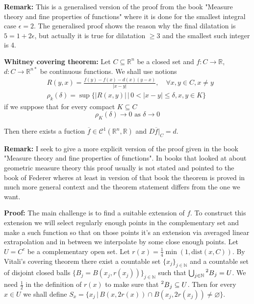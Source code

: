 \documentclass{article}
\begin{document}
\vspace{1ex}
\textbf{Remark:} This is a generalised version of the proof from the book
"Measure theory and fine properties of functions" where it is done for the
smallest integral case $\epsilon = 2$. The generalised proof shows the reason
why the final dilatation is $5 = 1+2\epsilon$, but actually it is true for
dilatation $\ge 3$ and the smallest such integer is 4.

\vspace{1ex}
\textbf{Whitney covering theorem:}
Let $C\subseteq \mathbb{R}^n$ be a closed set and $f:C\rightarrow\mathbb R$,
$d:C\rightarrow\mathbb{R}^{n*}$ be continuous functions. We shall use notions
\[
\begin{aligned}
    &R(y,x)=\frac{f(y)-f(x)-d(x)(y-x)}{|x-y|},\quad\forall x,y\in C, x\neq y \\
    &\rho_k(\delta)=\sup\{|R(x,y)|\, |\, 0<|x-y|\leq\delta, x, y\in K\}
\end{aligned}
\]
if we suppose that for every compact $K\subseteq C$
\begin{equation}
\rho_K(\delta)\rightarrow 0\text{ as }\delta\rightarrow 0
\end{equation}

Then there exists a fuction $\overline f\in\mathcal{C}^1(\mathbb{R}^n,\mathbb{R})$
and $D\overline f|_C=d$.

\vspace{1ex}
\textbf{Remark:}
I seek to give a more explicit version of the proof given in the book "Measure
theory and fine properties of functions". In books that looked at about
geometric measure theory this proof usually is not stated and pointed to the
book of Federer wheres at least in version of that book the theorem is proved
in much more general context and the theorem statement differs from the one we
want.

\vspace{1ex}
\textbf{Proof:}
The main challenge is to find a suitable extension of $f$. To construct this
extension we will select regularly enough points in the complementary set and
make a such function so that on those points it's an extension via averaged linear extrapolation and in
between we interpolate by some close enough points. Let $U=C^c$ be a complementary
open set. Let $r(x)=\frac{1}{4}\min(1,\text{dist}(x,C))$.
By Vitali's covering theorem there exist a countable set
$\{x_j\}_{j\in\mathbb{N}}$ and a countable set of disjoint closed balls $\{B_j=B(x_j, r(x_j))\}_
{j\in\mathbb{N}}$ such that $\bigcup_{j\in\mathbb{N}}\prescript{2}{}B_j=U$. We
need $\frac{1}{2}$ in the definition of $r(x)$ to make sure that $\prescript{2}{}
B_j\subseteq U$. Then for every $x\in U$ we shall define $S_x=\{x_j\,|\,B(x,2r(x))
\cap B(x_j,2r(x_j))\neq\varnothing\}$. 
\end{document}
